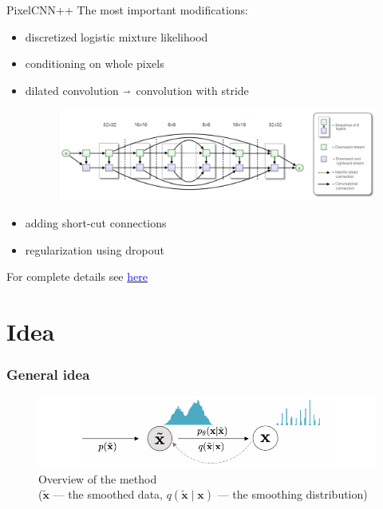 \documentclass[t]{beamer}  %
\begin{document}
\begin{frame}{PixelCNN++ \cite{pixelplus}}
The most important modifications:
\begin{itemize}
  \pause
  \item  discretized logistic mixture likelihood
  \pause
  \item  conditioning on whole pixels
  \pause
  \item  dilated convolution $\shortrightarrow$ convolution with stride
  \begin{figure}[hp]
    \centering
    \includegraphics[scale=0.6]{images/shortcut.png}
\end{figure}
  \pause
  \item  adding short-cut connections
  \pause
  \item  regularization using  dropout
\end{itemize}
\hspace{18em} \footnotesize For complete details see \href{https://github.com/openai/pixel-cnn}{\textcolor{blue}{here}}
\end{frame}


\section{Idea}
\begin{frame}[c]
\frametitle{General idea}
\begin{figure}[hp]
    \centering
    \includegraphics[width=\textwidth]{images/general.pdf}
    \caption[c]{Overview of the method \\ 
    ($\tilde{\bm{x}}$ --- the smoothed data, $q(\tilde{\bm{x}} \mid \bm{x})$ --- the smoothing distribution) \cite{orig}}
\end{figure}
\end{frame}
\end{document}
